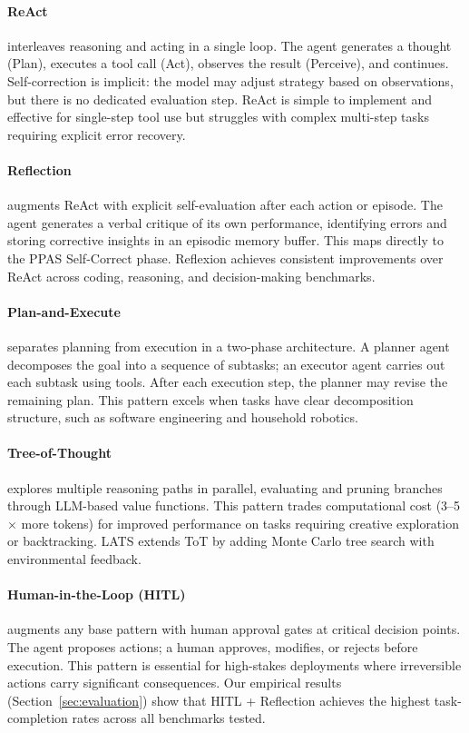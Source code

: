 \documentclass[review,authoryear]{elsarticle}
\theoremstyle{definition}
\begin{document}
\paragraph{ReAct} \citep{yao2023react} interleaves reasoning and acting in a single loop. The agent generates a thought (Plan), executes a tool call (Act), observes the result (Perceive), and continues. Self-correction is implicit: the model may adjust strategy based on observations, but there is no dedicated evaluation step. ReAct is simple to implement and effective for single-step tool use but struggles with complex multi-step tasks requiring explicit error recovery.

\paragraph{Reflection} \citep{shinn2023reflexion} augments ReAct with explicit self-evaluation after each action or episode. The agent generates a verbal critique of its own performance, identifying errors and storing corrective insights in an episodic memory buffer. This maps directly to the PPAS Self-Correct phase. Reflexion achieves consistent improvements over ReAct across coding, reasoning, and decision-making benchmarks.

\paragraph{Plan-and-Execute} separates planning from execution in a two-phase architecture. A planner agent decomposes the goal into a sequence of subtasks; an executor agent carries out each subtask using tools. After each execution step, the planner may revise the remaining plan. This pattern excels when tasks have clear decomposition structure, such as software engineering \citep{cognition2024devin} and household robotics.

\paragraph{Tree-of-Thought} \citep{yao2024tree} explores multiple reasoning paths in parallel, evaluating and pruning branches through LLM-based value functions. This pattern trades computational cost (3--5$\times$ more tokens) for improved performance on tasks requiring creative exploration or backtracking. LATS \citep{zhou2024language} extends ToT by adding Monte Carlo tree search with environmental feedback.

\paragraph{Human-in-the-Loop (HITL)} augments any base pattern with human approval gates at critical decision points. The agent proposes actions; a human approves, modifies, or rejects before execution. This pattern is essential for high-stakes deployments where irreversible actions carry significant consequences. Our empirical results (Section~\ref{sec:evaluation}) show that HITL + Reflection achieves the highest task-completion rates across all benchmarks tested.
\end{document}
